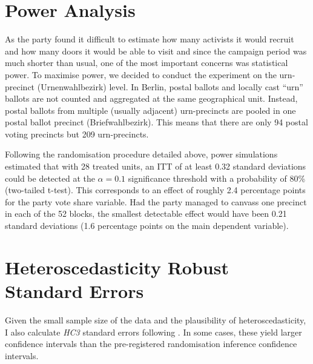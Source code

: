 \documentclass[11pt,a4paper]{scrartcl}
\begin{document}
\begin{appendices}
\begin{refsection}
		\section{Power Analysis}\label{A:power}
		As the party found it difficult to estimate how many activists it would recruit and how many doors it would be able to visit and since the campaign period was much shorter than usual, one of the most important concerns was statistical power. To maximise power, we decided to conduct the experiment on the urn-precinct (Urnenwahlbezirk) level. In Berlin, postal ballots and locally cast \enquote{urn} ballots are not counted and aggregated at the same geographical unit. Instead, postal ballots from multiple (usually adjacent) urn-precincts are pooled in one postal ballot precinct (Briefwahlbezirk). This means that there are only 94 postal voting precincts but 209 urn-precincts.

		Following the randomisation procedure detailed above, power simulations estimated that with 28 treated units, an ITT of at least 0.32 standard deviations could be detected at the $\alpha = 0.1$ significance threshold with a probability of 80\% (two-tailed t-test). This corresponds to an effect of roughly 2.4 percentage points for the party vote share variable. Had the party managed to canvass one precinct in each of the 52 blocks, the smallest detectable effect would have been 0.21 standard deviations (1.6 percentage points on the main dependent variable).


		
		

		\section{ Heteroscedasticity Robust Standard Errors}\label{A:ses}

		Given the small sample size of the data and the plausibility of heteroscedasticity, I also calculate \emph{HC3} standard errors following \textcite{longUsingHeteroscedasticityConsistent2000}. In some cases, these yield larger confidence intervals than the pre-registered randomisation inference confidence intervals.

		


\end{refsection}
\end{appendices}
\end{document}
